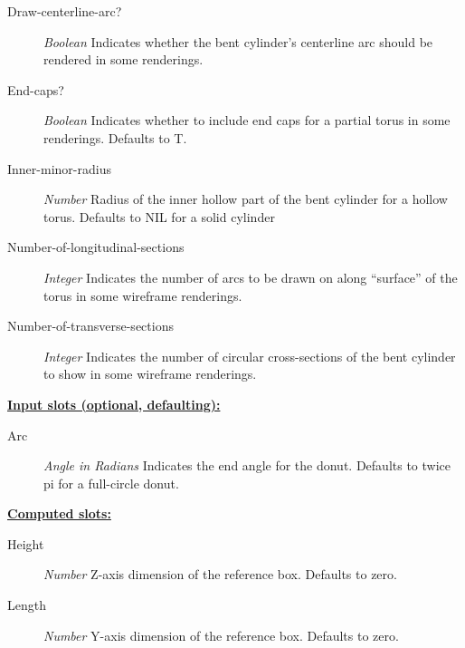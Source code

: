 \documentclass [11pt]{book}
\begin{document}
\begin{itemize}
\begin{description}

\item [Draw-centerline-arc?]
\emph{Boolean} Indicates whether the bent cylinder's centerline arc should be rendered in some renderings.


\item [End-caps?]
\emph{Boolean} Indicates whether to include end caps for a partial torus in some renderings. Defaults to T.


\item [Inner-minor-radius]
\emph{Number} Radius of the inner hollow part of the bent cylinder for a hollow torus. Defaults to NIL for a solid cylinder


\item [Number-of-longitudinal-sections]
\emph{Integer} Indicates the number of arcs to be drawn on along ``surface'' of the torus in some wireframe renderings.


\item [Number-of-transverse-sections]
\emph{Integer} Indicates the number of circular cross-sections of the bent cylinder to show in some wireframe renderings.


\end{description}






\textbf{
\underline{Input slots (optional, defaulting):}}

\begin{description}

\item [Arc]
\emph{Angle in Radians} Indicates the end angle for the donut. Defaults to twice pi for a full-circle donut.


\end{description}






\textbf{
\underline{Computed slots:}}

\begin{description}

\item [Height]
\emph{Number} Z-axis dimension of the reference box. Defaults to zero.


\item [Length]
\emph{Number} Y-axis dimension of the reference box. Defaults to zero.



\end{description}
\end{itemize}
\end{document}
